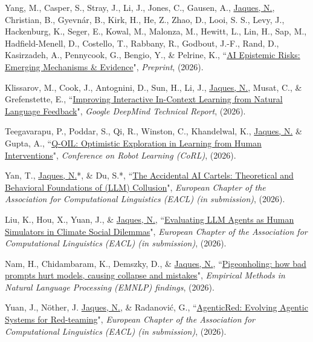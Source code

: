 \documentclass[paper=letter,fontsize=11pt]{scrartcl} %
\newcommand{\PaperEntry}[6]{
		\noindent #1, ``\href{#6}{#2}", \textit{#3}, #4 (#5).}
\begin{document}
\begin{etaremune}
\item \PaperEntry{Yang, M., Casper, S., Stray, J., Li, J., Jones, C., Gausen, A., \underline{Jaques, N.}, Christian, B., Gyevnár, B., Kirk, H., He, Z., Zhao, D., Looi, S. S., Levy, J., Hackenburg, K., Seger, E., Kowal, M., Malonza, M., Hewitt, L., Lin, H., Sap, M., Hadfield-Menell, D., Costello, T., Rabbany, R., Godbout, J.-F., Rand, D., Kasirzadeh, A., Pennycook, G., Bengio, Y., \& Pelrine, K.}{AI Epistemic Risks: Emerging Mechanisms \& Evidence}{Preprint}{}{2026}{https://papers.ssrn.com/sol3/papers.cfm?abstract_id=6873005}

\item \PaperEntry{Klissarov, M., Cook, J., Antognini, D., Sun, H., Li, J., \underline{Jaques, N.}, Musat, C., \& Grefenstette, E.}{Improving Interactive In-Context Learning from Natural Language Feedback}{Google DeepMind Technical Report}{}{2026}{https://arxiv.org/abs/2602.16066}

\item \PaperEntry{Teegavarapu, P., Poddar, S., Qi, R., Winston, C., Khandelwal, K., \underline{Jaques, N.} \& Gupta, A.}{Q-OIL: Optimistic Exploration in Learning from Human Interventions}{Conference on Robot Learning (CoRL)}{}{2026}{}

\item \PaperEntry{Yan, T., \underline{Jaques, N.}*, \& Du, S.*}{The Accidental AI Cartels: Theoretical and Behavioral Foundations of (LLM) Collusion}{European Chapter of the Association for Computational Linguistics (EACL) (in submission)}{}{2026}{}

\item \PaperEntry{Liu, K., Hou, X., Yuan, J.,  \& \underline{Jaques, N.}}{Evaluating LLM Agents as Human Simulators in Climate Social Dilemmas}{European Chapter of the Association for Computational Linguistics (EACL) (in submission)}{}{2026}{}

\item \PaperEntry{Nam, H., Chidambaram, K., Demszky, D., \& \underline{Jaques, N.}}{Pigeonholing: how bad prompts hurt models, causing collapse and mistakes}{Empirical Methods in Natural Language Processing (EMNLP) findings}{}{2026}{https://arxiv.org/abs/2606.24267}

\item \PaperEntry{Yuan, J., Nöther, J. \underline{Jaques, N.}, \& Radanović, G.}{AgenticRed: Evolving Agentic Systems for Red-teaming}{European Chapter of the Association for Computational Linguistics (EACL) (in submission)}{}{2026}{https://arxiv.org/abs/2601.13518}


\end{etaremune}
\end{document}
